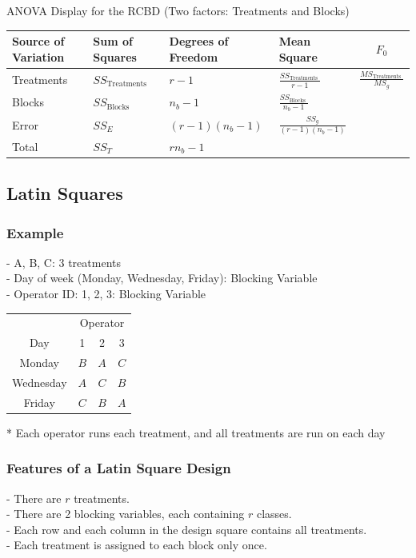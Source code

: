 \documentclass[11pt,a4paper]{article}
\begin{document}
ANOVA Display for the RCBD (Two factors: Treatments and Blocks)\\
\begin{tabular}{|l|l|l|l|c|}
\hline Source of Variation & Sum of Squares & Degrees of Freedom & Mean Square & $F_{0}$ \\
\hline Treatments & $S S_{\text {Treatments }}$ & $r-1$ & $\frac{S S_{\text {Treatments }}}{r-1}$ & $\frac{M S_{\text {Treatments }}}{M S_{g}}$ \\
\hline Blocks & $S S_{\text {Blocks }}$ & $n_b-1$ & $\frac{S S_{\text {Blocks }}}{n_b-1}$ & \\
\hline Error & $S S_{E}$ & $(r-1)(n_b-1)$ & $\frac{S S_{g}}{(r-1)(n_b-1)}$ & \\
\hline Total & $S S_{T}$ & $rn_b-1$ & & \\
\hline
\end{tabular}





\subsection{ Latin Squares}

\subsubsection{Example}
- A, B, C: 3 treatments\\
- Day of week (Monday, Wednesday, Friday): Blocking Variable\\
- Operator ID: 1, 2, 3: Blocking Variable\\
\begin{center}
\begin{tabular}{cccc}
& \multicolumn{3}{c}{ Operator } \\
Day & 1 & 2 & 3 \\
\hline Monday & $B$ & $A$ & $C$ \\
Wednesday & $A$ & $C$ & $B$ \\
Friday & $C$ & $B$ & $A$ \\
\hline
\end{tabular}
\end{center}
* Each operator runs each treatment, and all treatments are run on each day


\subsubsection{ Features of a Latin Square Design}
- There are $r$ treatments.\\
- There are 2 blocking variables, each containing $r$ classes.\\
- Each row and each column in the design square contains all treatments.\\
- Each treatment is assigned to each block only once.\\
\end{document}
